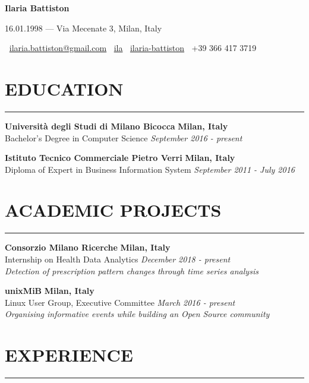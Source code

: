 \documentclass[10pt]{article}
\begin{document}
	\begin{center}
		{\LARGE \textbf{Ilaria Battiston}}
		
		{\large 16.01.1998 --- Via Mecenate 3, Milan, Italy}
		
		\faEnvelope $\:$ \href{mailto:ilaria.battiston@gmail.com}{ilaria.battiston@gmail.com} \qquad \faGithub $\:$ \href{https://github.com/ila}{ila} \qquad \faLinkedin $\:$ \href{https://www.linkedin.com/in/ilaria-battiston-a53014175/}{ilaria-battiston} \qquad \faMobilePhone $\:$ +39 366 417 3719
	\end{center}
	
	\section*{EDUCATION}
	{\color{darkRed}\rule{\linewidth}{0.5pt}}
	
	\textbf{Università degli Studi di Milano Bicocca}
	\hfill
	\textbf{Milan, Italy} \\
	Bachelor's Degree in Computer Science
	\hfill
	\textit{September 2016 - present}
	
	\textbf{Istituto Tecnico Commerciale Pietro Verri}
	\hfill
	\textbf{Milan, Italy} \\
	Diploma of Expert in Business Information System
	\hfill
	\textit{September 2011 - July 2016}
	
	\section*{ACADEMIC PROJECTS}
	{\color{darkRed}\rule{\linewidth}{0.5pt}}
	
	\textbf{Consorzio Milano Ricerche}
	\hfill
	\textbf{Milan, Italy} \\
	Internship on Health Data Analytics
	\hfill
	\textit{December 2018 - present} \\
	\textit{Detection of prescription pattern changes through time series analysis}
	
	\textbf{unixMiB}
	\hfill
	\textbf{Milan, Italy} \\
	Linux User Group, Executive Committee
	\hfill
	\textit{March 2016  - present} \\
	\textit{Organising informative events while building an Open Source community}
	
	
	\section*{EXPERIENCE}
	{\color{darkRed}\rule{\linewidth}{0.5pt}}
	
\end{document}
